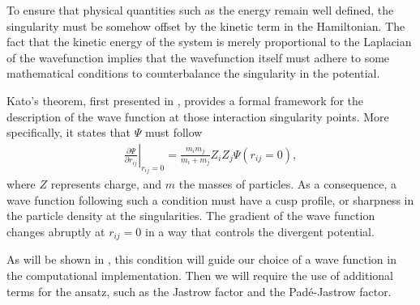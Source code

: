 To ensure that physical quantities such as the energy remain well defined, the singularity must be somehow offset by the kinetic term in the Hamiltonian. The fact that the kinetic energy of the system is merely proportional to the Laplacian of the wavefunction implies that the wavefunction itself must adhere to some mathematical conditions to counterbalance the singularity in the potential.

Kato's theorem, first presented in \cite{kato1957eigenfunctions}, provides a formal framework for the description of the wave function at those interaction singularity points. More specifically, it states that $\Psi$ must follow
\begin{align*}
    \left.\frac{\partial \Psi}{\partial r_{ij}} \right|_{r_{ij}=0} = \frac{m_i m_j}{m_i + m_j}Z_i Z_j \Psi(r_{ij} = 0),
\end{align*}
where $Z$ represents charge, and $m$ the masses of particles. As a consequence, a wave function following such a condition must have a cusp profile, or sharpness in the particle density at the singularities. The gradient of the wave function changes abruptly at $r_{ij} = 0$ in a way that controls the divergent potential.

As will be shown in , this condition will guide our choice of a wave function in the computational implementation. Then we will require the use of additional terms for the ansatz, such as the Jastrow factor and the Padé-Jastrow factor.





